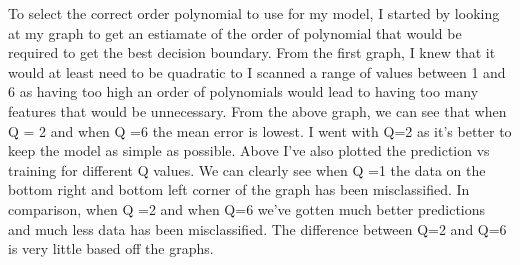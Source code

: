 \documentclass[11pt]{article} %
\begin{document}
\begin{figure}[h]
\centering
{}
\qquad
{}
\qquad
{}
\qquad
\end{figure}
To select the correct order polynomial to use for my model, I started by looking at my graph to get an estiamate of the order of polynomial that would be required to get the best decision boundary. From the first graph, I knew that it would at least need to be quadratic to I scanned a range of values between 1 and 6 as having too high an order of polynomials would lead to having too many features that would be unnecessary. From the above graph, we can see that when Q = 2 and when Q =6 the mean error is lowest. I went with Q=2 as it's better to keep the model as simple as possible. Above I've also plotted the prediction vs training for different Q values. We can clearly see when Q =1 the data on the bottom right and bottom left corner of the graph has been misclassified. In comparison, when Q =2 and when Q=6 we've gotten much better predictions and much less data has been misclassified. The difference between Q=2 and Q=6 is very little based off the graphs.  \newpage
\end{document}
